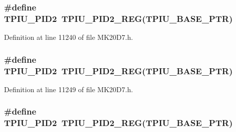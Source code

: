 \subsubsection[{\texorpdfstring{T\+P\+I\+U\+\_\+\+P\+I\+D2}{TPIU_PID2}}]{\setlength{\rightskip}{0pt plus 5cm}\#define T\+P\+I\+U\+\_\+\+P\+I\+D2~{\bf T\+P\+I\+U\+\_\+\+P\+I\+D2\+\_\+\+R\+EG}({\bf T\+P\+I\+U\+\_\+\+B\+A\+S\+E\+\_\+\+P\+TR})}\hypertarget{group___t_p_i_u___register___accessor___macros_ga8b9d0fd1a39ca0c08c64f59f9c64316d}{}\label{group___t_p_i_u___register___accessor___macros_ga8b9d0fd1a39ca0c08c64f59f9c64316d}


Definition at line 11240 of file M\+K20\+D7.\+h.

\subsubsection[{\texorpdfstring{T\+P\+I\+U\+\_\+\+P\+I\+D2}{TPIU_PID2}}]{\setlength{\rightskip}{0pt plus 5cm}\#define T\+P\+I\+U\+\_\+\+P\+I\+D2~{\bf T\+P\+I\+U\+\_\+\+P\+I\+D2\+\_\+\+R\+EG}({\bf T\+P\+I\+U\+\_\+\+B\+A\+S\+E\+\_\+\+P\+TR})}\hypertarget{group___t_p_i_u___register___accessor___macros_ga8b9d0fd1a39ca0c08c64f59f9c64316d}{}\label{group___t_p_i_u___register___accessor___macros_ga8b9d0fd1a39ca0c08c64f59f9c64316d}


Definition at line 11249 of file M\+K20\+D7.\+h.

\subsubsection[{\texorpdfstring{T\+P\+I\+U\+\_\+\+P\+I\+D2}{TPIU_PID2}}]{\setlength{\rightskip}{0pt plus 5cm}\#define T\+P\+I\+U\+\_\+\+P\+I\+D2~{\bf T\+P\+I\+U\+\_\+\+P\+I\+D2\+\_\+\+R\+EG}({\bf T\+P\+I\+U\+\_\+\+B\+A\+S\+E\+\_\+\+P\+TR})}\hypertarget{group___t_p_i_u___register___accessor___macros_ga8b9d0fd1a39ca0c08c64f59f9c64316d}{}\label{group___t_p_i_u___register___accessor___macros_ga8b9d0fd1a39ca0c08c64f59f9c64316d}


